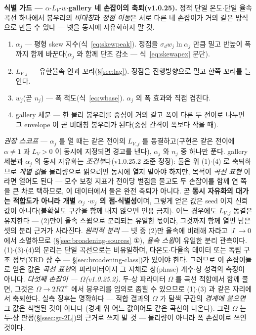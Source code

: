 \begin{warnbox}
\textbf{식별 가드 --- $\alpha$$\cdot$$L_V$$\cdot$$w$$\cdot$gallery 네 손잡이의 축퇴(v1.0.25).} 정적 단일
온도$\cdot$단일 율속 곡선 하나에서 봉우리의 \emph{비대칭}과 \emph{정점 이동}은 서로 다른 네 손잡이가
거의 같은 방식으로 만들 수 있다 --- 넷을 동시에 자유화하지 말 것.
\begin{enumerate}[label=(\arabic*),leftmargin=2.0em,itemsep=2pt]
\item $\alpha_j$ --- 평형 skew 지수(식~\eqref{eq:skewpeak}). 정점을 $\sigma_d w_j\ln\alpha_j$ 만큼 밀고
반높이 폭까지 함께 바꾼다($\alpha_j$ 와 함께 단조 감소 --- 식~\eqref{eq:skewapex} 문단).
\item $L_{V,j}$ --- 유한율속 인과 꼬리(\S\ref{sec:lag}). 정점을 진행방향으로 밀고 한쪽 꼬리를 늘인다.
\item $w_j$(곧 $n_j$) --- 폭 척도(식~\eqref{eq:wbase}). $\alpha_j$ 의 폭 효과와 직접 겹친다.
\item gallery 세분 --- 한 물리 봉우리를 중심이 거의 같고 폭이 다른 두 전이로 나누면 그 envelope 이 곧
비대칭 봉우리가 된다(중심 간격이 폭보다 작을 때).
\end{enumerate}
\emph{권장 스코프} --- $\alpha_j$ 를 열 때는 같은 전이의 $L_{V,j}$ 를 동결하고(구현은 같은 전이에
$\alpha\ne1$ 과 $L_V>0$ 이 동시에 지정되면 경고를 낸다), $\alpha_j$ 와 $n_j$ 중 하나만 푼다.
gallery 세분과 $\alpha_j$ 의 동시 자유화는 \emph{조건부}다(v1.0.25.2 조준 정정): 둘은 위 (1)$\cdot$(4)
로 축퇴하므로 \emph{개별 값}을 물리량으로 읽으려면 동시에 열지 말아야 하지만, 목적이 \emph{곡선 표현}
이라면 열어도 된다 --- 모수 보정 지표가 전이당 벌점을 물고도 두 손잡이를 함께 연 쪽을 큰 차로 택하므로,
이 데이터에서 둘은 완전 축퇴가 아니다. 곧 \textbf{동시 자유화의 대가는 적합도가 아니라 개별 $\alpha_j$
$\cdot$$w_j$ 의 점-식별성}이며, 그렇게 얻은 값은 seed 이지 신뢰값이 아니다(불확실도 구간을 함께 내지
않으면 인용 금지). 어느 경우에도 $L_{V,j}$ 동결은 유지한다 --- (2)만이 율속 스윕으로 분리되는 유일한
몫이라, 그것까지 함께 열면 남은 셋의 분리 근거가 사라진다.
\emph{원리적 분리} --- 넷 중 (2)만 율속에 비례해 자라고 $|I|\!\to\!0$ 에서 소멸하므로
(\S\ref{sec:broadening-sources} ①), \emph{율속 스윕}이 유일한 분리 관측이다. (1)$\cdot$(3)$\cdot$(4)의
분리는 단일 곡선으로는 비유일하며, 다온도$\cdot$다율속 데이터 또는 독립 구조 정보(XRD 상 수 ---
\S\ref{sec:broadening-class})가 있어야 한다. 그러므로 이 손잡이들로 얻은 값은 \emph{곡선 표현}의
파라미터이지 그 자체로 상(phase) 개수$\cdot$상 성격의 측정이 아니다.
\emph{다섯째 손잡이 --- $\Omega$(v1.0.25.2).} 두-상 파라미터 $\Omega$ 를 곡선 적합에서 함께 풀면, 그것은
$\Omega\!\to\!2RT^+$ 에서 봉우리를 임의로 좁힐 수 있으므로 (1)$\cdot$(3) 과 같은 자리에서 축퇴한다. 실측
징후는 명확하다 --- 적합 결과의 $\Omega$ 가 탐색 구간의 \emph{경계에 붙으면} 그 값은 식별된 것이 아니다
(경계 위 어느 값이어도 같은 곡선이 나온다). 그런 $\Omega$ 는 두-상 판정(\S\ref{ssec:gr-2L})의 근거로 쓰지
말 것 --- 물리량이 아니라 폭 손잡이로 쓰인 것이다.
\end{warnbox}


